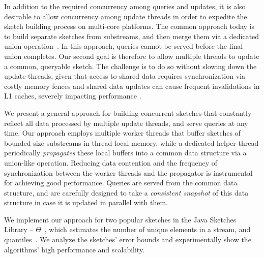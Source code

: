 In addition to the required concurrency among queries and updates,
it is also desirable to allow
concurrency among update threads in order to expedite the sketch building process on multi-core platforms. 
The common approach today is to build separate sketches from substreams, 
and then merge them via a dedicated union operation~\cite{multi-KMV}. 
In this approach, queries cannot be served before the final union completes. 
Our second goal is therefore to allow multiple threads to update a common, 
queryable sketch. The challenge is to do so without slowing down the update threads,
given that access to shared data requires  synchronization via costly memory fences 
and shared data updates can cause frequent invalidations in L1 caches, severely impacting performance
. 


We present a general approach for building concurrent sketches that
constantly reflect all data processed by multiple update threads, 
and serve queries at any time. %
Our  approach employs multiple worker threads that buffer sketches of bounded-size substreams in thread-local memory, while a dedicated helper thread 
periodically \emph{propagates} these local buffers into a common data structure via a union-like operation.
 Reducing data contention and the frequency of synchronization between the worker threads and the propagator is instrumental for achieving good performance. Queries are served from the common data structure, and are carefully 
 designed to take a \emph{consistent snapshot} of this data structure in case it is updated in parallel with them.

We implement our approach for two popular sketches in the Java Sketches Library -- $\Theta$~\cite{Theta},
which estimates the number of unique elements in a stream, and quantiles~\cite{quantiles}.
We analyze the sketches' error bounds
and experimentally show the algorithms' high performance and scalability. 
  

